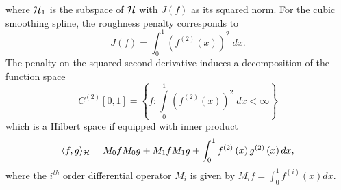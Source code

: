 \noindent
where $\mathcal{H}_1$ is the subspace of $\mathcal{H}$ with $J\left(f\right)$ as its squared norm. For the cubic smoothing spline, the roughness penalty corresponds to 
\begin{equation} \label{eq:SS-penalty-functional}
J\left(f\right) = \int_0^1  \left(f^{\left(2\right)}\left(x\right)\right)^2\;dx.
\end{equation}
\noindent
The penalty on the squared second derivative induces a decomposition of the function space
\[
C^{\left(2\right)}\left[0,1\right] = \left\{f: \int \limits_{0}^1 \left(f^{\left(2\right)}\left(x\right)\right)^2\;dx < \infty \right\}
\]
\noindent %
which is a Hilbert space if equipped with inner product
\begin{align} \label{eq:SS-RKHS-inner-product}
\langle f,g \rangle_\hilbert=M_{0} f M_{0} g + M_{1} f M_{1} g + \int_0^1 f^{\left( 2 \right)}\left(x\right)g^{\left( 2 \right)}\left(x\right)dx,%
\end{align}
\noindent
where the $i^{th}$ order differential operator $M_i$ is given by $M_i f = \int_0^1 f^{\left( i \right)}\left(x\right) dx$. 

\noindent


\bigskip
 
